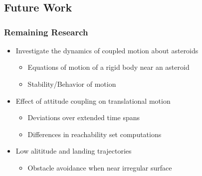\section*{}
\subsection*{Future Work}

\begin{frame}[t]\frametitle{Remaining Research}

    \begin{itemize}
        \item Investigate the dynamics of coupled motion about asteroids
        \begin{itemize}
            \item Equations of motion of a rigid body near an asteroid
            \item Stability/Behavior of motion
        \end{itemize}
        \item Effect of attitude coupling on translational motion
        \begin{itemize}
            \item Deviations over extended time spans
            \item Differences in reachability set computations
        \end{itemize}
        \item Low alititude and landing trajectories
        \begin{itemize}
            \item Obstacle avoidance when near irregular surface
        \end{itemize}
    \end{itemize}
\end{frame}